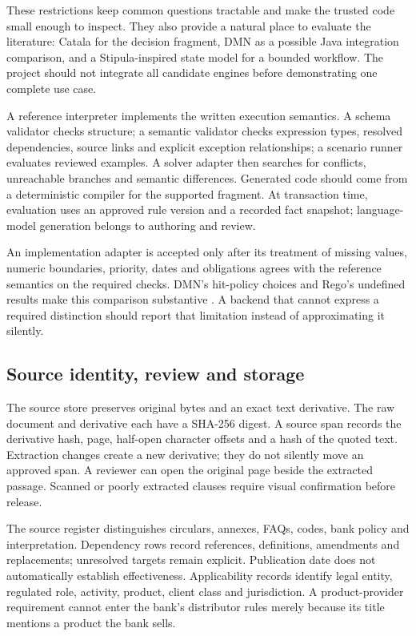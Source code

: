 These restrictions keep common questions tractable and make the trusted code
small enough to inspect. They also provide a natural place to evaluate the
literature: Catala for the decision fragment, DMN as a possible Java integration comparison,
and a Stipula-inspired state model for a bounded workflow. The project should not
integrate all candidate engines before demonstrating one complete use case.

A reference interpreter implements the written execution semantics. A schema
validator checks structure; a semantic validator checks expression types,
resolved dependencies,
source links and explicit exception relationships; a scenario runner evaluates
reviewed examples. A solver adapter then searches for conflicts, unreachable
branches and semantic differences. Generated code should come from a deterministic
compiler for the supported fragment. At transaction time, evaluation uses an
approved rule version and a recorded fact snapshot; language-model generation
belongs to authoring and review.

An implementation adapter is accepted only after its treatment of missing
values, numeric boundaries, priority, dates and obligations agrees with the
reference semantics on the required checks. DMN's hit-policy choices and Rego's
undefined results make this comparison substantive
\citep{dmn2024,opadocs}. A backend that cannot express a required distinction
should report that limitation instead of approximating it silently.

\subsection{Source identity, review and storage}
\label{merge:P-03c-storage-review:00}


The source store preserves original bytes and an exact text derivative. The raw
document and derivative each have a SHA-256 digest. A source span records the
derivative hash, page, half-open character offsets and a hash of the quoted text.
Extraction changes create a new derivative; they do not silently move an approved
span. A reviewer can open the original page beside the extracted passage.
Scanned or poorly extracted clauses require visual confirmation before release.

The source register distinguishes circulars, annexes, FAQs, codes, bank policy
and interpretation. Dependency rows record references, definitions, amendments
and replacements; unresolved targets remain explicit. Publication date does not
automatically establish effectiveness. Applicability records identify legal
entity, regulated role, activity, product, client class and jurisdiction. A
product-provider requirement cannot enter the bank's distributor rules merely
because its title mentions a product the bank sells.

